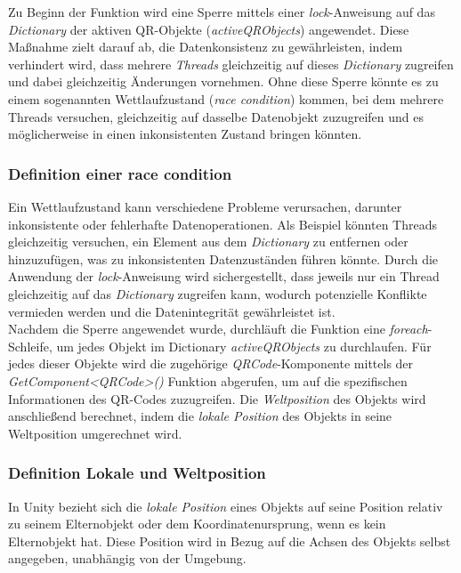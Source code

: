 Zu Beginn der Funktion wird eine Sperre mittels einer \textit{lock}-Anweisung auf das \textit{Dictionary} der aktiven QR-Objekte
(\textit{activeQRObjects}) angewendet. Diese Maßnahme zielt darauf ab, die Datenkonsistenz zu gewährleisten, indem verhindert
wird, dass mehrere \textit{Threads} gleichzeitig auf dieses \textit{Dictionary} zugreifen und dabei gleichzeitig Änderungen
vornehmen. Ohne diese Sperre könnte es zu einem sogenannten Wettlaufzustand (\textit{race condition}) kommen, bei dem mehrere
Threads versuchen, gleichzeitig auf dasselbe Datenobjekt zuzugreifen und es möglicherweise in einen inkonsistenten Zustand
bringen könnten.

\subsubsection*{Definition einer race condition}
Ein Wettlaufzustand kann verschiedene Probleme verursachen, darunter inkonsistente oder fehlerhafte Datenoperationen. Als
Beispiel könnten Threads gleichzeitig versuchen, ein Element aus dem \textit{Dictionary} zu entfernen oder hinzuzufügen,
was zu inkonsistenten Datenzuständen führen könnte. Durch die Anwendung der \textit{lock}-Anweisung wird sichergestellt,
dass jeweils nur ein Thread gleichzeitig auf das \textit{Dictionary} zugreifen kann, wodurch potenzielle Konflikte vermieden
werden und die Datenintegrität gewährleistet ist.\\

Nachdem die Sperre angewendet wurde, durchläuft die Funktion eine \textit{foreach}-Schleife, um jedes Objekt im Dictionary
\textit{activeQRObjects} zu durchlaufen. Für jedes dieser Objekte wird die zugehörige \textit{QRCode}-Komponente mittels
der \textit{GetComponent<QRCode>()} Funktion abgerufen, um auf die spezifischen Informationen des QR-Codes zuzugreifen.
Die \textit{Weltposition} des Objekts wird anschließend berechnet, indem die \textit{lokale Position} des Objekts in
seine Weltposition umgerechnet wird.

\subsubsection*{Definition Lokale und Weltposition} %
In Unity bezieht sich die \textit{lokale Position} eines Objekts auf seine Position relativ zu seinem Elternobjekt oder
dem Koordinatenursprung, wenn es kein Elternobjekt hat. Diese Position wird in Bezug auf die Achsen des Objekts selbst
angegeben, unabhängig von der Umgebung.

